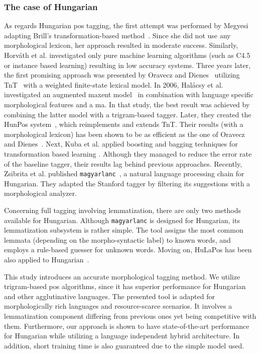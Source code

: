 \subsubsection{The case of Hungarian}

As regards Hungarian \gls{pos} tagging, the first attempt was performed by Megyesi~\cite{Megyesi1998} adapting Brill’s transformation-based method~\cite{Brill1992}. %
Since she did not use any morphological lexicon, her approach resulted in moderate success.
Similarly, Horváth et al. investigated \cite{Horvath1999} only pure machine learning algorithms (such as C4.5 or instance based learning) resulting in low accuracy systems.
Three years later, the first promising approach was presented by Oravecz and Dienes~\cite{Oravecz2002a} utilizing TnT~\cite{Brants2000} with a weighted finite-state lexical model.
In 2006, Halácsy et al. investigated an augmented \acrshort{maxent} model~\cite{Halacsy2006} in combination with language specific morphological features and a \acrshort{ma}.
In that study, the best result was achieved by combining the latter model with a trigram-based tagger.
Later, they created the HunPos system~\cite{Halacsy2007}, which reimplements and extends TnT.
Their results (with a morphological lexicon) has been shown to be as efficient as the one of Oravecz and Dienes~\cite{Oravecz2002a}.
Next, Kuba et al. applied boosting and bagging techniques for transformation based learning \cite{Kuba2004}.
Although they managed to reduce the error rate of the baseline tagger, their results lag behind previous approaches.
Recently, Zsibrita et al. published \texttt{magyarlanc}~\cite{zsibrata2013magyarlanc}, a natural language processing chain for Hungarian.
They adapted the Stanford tagger by filtering its suggestions with a morphological analyzer. 

Concerning full tagging involving lemmatization, there are only two methods available for Hungarian.
Although \texttt{magyarlanc} is designed for Hungarian, its lemmatization subsystem is rather simple.
The tool assigns the most common lemmata (depending on the morpho-syntactic label) to known words, and employs a rule-based guesser for unknown words.
Moving on, HuLaPos has been also applied to Hungarian~\cite{Laki2013}. %

This study introduces an accurate morphological tagging method.
We utilize trigram-based \gls{pos} algorithms, since it has superior performance for Hungarian and other agglutinative languages.
The presented tool is adapted for morphologically rich languages and resource-scarce scenarios.
It involves a lemmatization component differing from previous ones yet being competitive with them.
Furthermore, our approach is shown to have state-of-the-art performance for Hungarian while utilizing a language independent hybrid architecture.
In addition, short training time is also guaranteed due to the simple model used.



